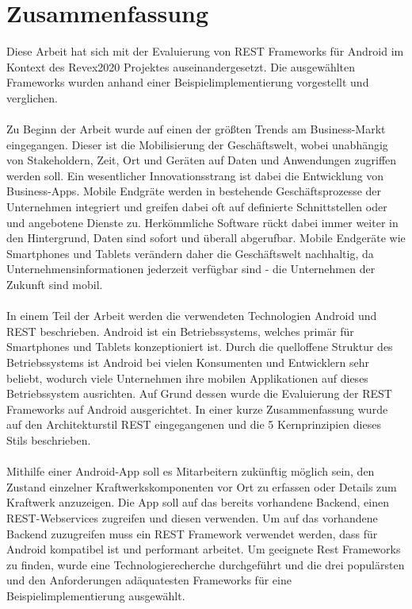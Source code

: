 \chapter{Zusammenfassung}
\label{sec:summary}
Diese Arbeit hat sich mit der Evaluierung von REST Frameworks für Android im Kontext des Revex2020 Projektes auseinandergesetzt. Die ausgewählten Frameworks wurden anhand einer Beispielimplementierung vorgestellt und verglichen.
\\\\
Zu Beginn der Arbeit wurde auf einen der größten Trends am Business-Markt eingegangen. Dieser ist die Mobilisierung der Geschäftswelt, wobei unabhängig von Stakeholdern, Zeit, Ort und Geräten auf Daten und Anwendungen zugriffen werden soll. Ein wesentlicher Innovationsstrang ist dabei die Entwicklung von Business-Apps. Mobile Endgräte werden in bestehende Geschäftsprozesse der Unternehmen integriert und greifen dabei oft auf definierte Schnittstellen oder und angebotene Dienste zu. Herkömmliche Software rückt dabei immer weiter in den Hintergrund, Daten sind sofort und überall abgerufbar. Mobile Endgeräte wie Smartphones und Tablets verändern daher die Geschäftswelt nachhaltig, da Unternehmensinformationen jederzeit verfügbar sind - die Unternehmen der Zukunft sind mobil.
\\\\
In einem Teil der Arbeit werden die verwendeten Technologien Android und REST beschrieben. Android ist ein Betriebssystems, welches primär für Smartphones und Tablets konzeptioniert ist. Durch die quelloffene Struktur des Betriebssystems ist Android bei vielen Konsumenten und Entwicklern sehr beliebt, wodurch viele Unternehmen ihre mobilen Applikationen auf dieses Betriebssystem ausrichten. Auf Grund dessen wurde die Evaluierung der REST Frameworks auf Android ausgerichtet. In einer kurze Zusammenfassung wurde auf den Architekturstil REST eingegangenen und die 5 Kernprinzipien dieses Stils beschrieben.
\\\\
Mithilfe einer Android-App soll es Mitarbeitern zukünftig möglich sein, den Zustand einzelner Kraftwerkskomponenten vor Ort zu erfassen oder Details zum Kraftwerk anzuzeigen. Die App soll auf das bereits vorhandene Backend, einen REST-Webservices zugreifen und diesen verwenden. Um auf das vorhandene Backend zuzugreifen muss ein REST Framework verwendet werden, dass für Android kompatibel ist und performant arbeitet. Um geeignete Rest Frameworks zu finden, wurde eine Technologierecherche durchgeführt und die drei populärsten und den Anforderungen adäquatesten Frameworks für eine Beispielimplementierung ausgewählt.
